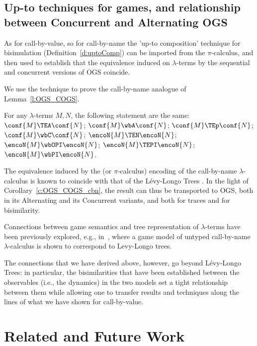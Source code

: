 \subsection{Up-to techniques for games, and relationship between Concurrent and Alternating OGS}
\label{ss:upto_games_cbn}

As for call-by-value, so for call-by-name the 
'up-to
  composition' technique for bisimulation 
(Definition~\ref{d:uptoComp}) 
can be imported from the $\pi$-calculus, and then used to establish that the equivalence
induced on $\lambda$-terms by the sequential and concurrent versions of OGS  coincide. 

We use  the technique to prove the call-by-name analogue of 
Lemma~\ref{l:OGS_COGS}. 



\begin{corollary}
\label{c:OGS_COGS_cbn}
For any   $\lambda$-terms $M,N$, the following statement are the same: 
$\conf{M} \TEA \conf {N}$;
$\conf{M} \wbA \conf {N}$;
$\conf{M} \TEp \conf {N}$;
$\conf{M} \wbC \conf {N}$;
$\encoN {{M} } \TEN\encoN {{N}}$; 
$\encoN {{M}} \wbOPI \encoN {{N}}$; 
$\encoN {{M} } \TEPI\encoN {{N}}$; 
$\encoN {{M}} \wbPI \encoN {{N}}$. 
\end{corollary} 
\noindent
The equivalence induced by the \piI (or  $\pi$-calculus) encoding of the call-by-name
$\lambda$-calculus is known to coincide with    that of the  
 L{\'e}vy-Longo Trees \cite{San95lazy}.  In the light of  
Corollary~\ref{c:OGS_COGS_cbn}, the result can thus be transported to OGS, both 
in its Alternating and its Concurrent variants, 
and both for traces and for bisimilarity.

Connections between game semantics and tree representation of $\lambda$-terms
have been previously explored, e.g.,  in~\cite{ong2004games}, 
where a game model of untyped call-by-name $\lambda$-calculus
is shown to correspond to Levy-Longo trees.

The connections that we have derived above, however, go beyond
L{\'e}vy-Longo Trees:
in particular,
the bisimilarities that have been established
between the observables (i.e., the dynamics) in the two models
set a tight relationship between them 
while allowing one to transfer results and techniques along the lines of what we have
shown for call-by-value.  
\section{Related and Future Work}
\label{s:cf}
              

